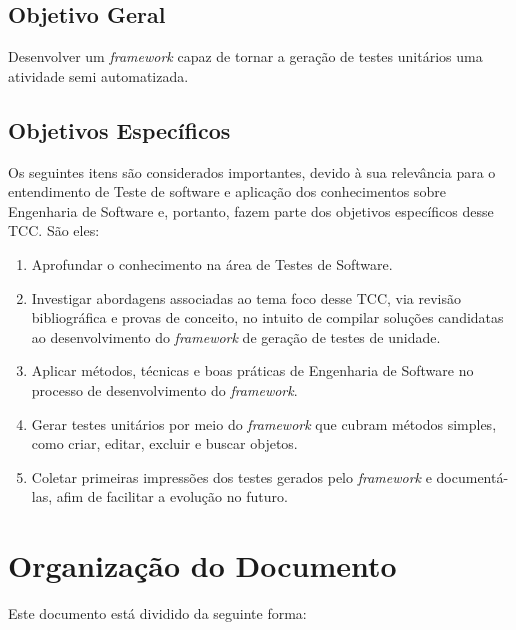     \subsection{Objetivo Geral}
    Desenvolver um \textit{framework} capaz de tornar a geração de testes unitários uma atividade semi automatizada.
    
    \subsection{Objetivos Específicos}
    Os seguintes itens são considerados importantes, devido à sua relevância para o entendimento de Teste de software e aplicação dos conhecimentos sobre Engenharia de Software e, portanto, fazem parte dos objetivos específicos desse TCC. São eles:

    \begin{enumerate}
      \item Aprofundar o conhecimento na área de Testes de Software.
      
      \item Investigar abordagens associadas ao tema foco desse TCC, via revisão bibliográfica e provas de conceito, no intuito de compilar soluções candidatas ao desenvolvimento do \textit{framework} de geração de testes de unidade.
      
      \item Aplicar métodos, técnicas e boas práticas de Engenharia de Software no processo de desenvolvimento do \textit{framework}.
      
      \item Gerar testes unitários por meio do \textit{framework} que cubram métodos simples, como criar, editar, excluir e buscar objetos.

      \item Coletar primeiras impressões dos testes gerados pelo \textit{framework} e documentá-las, afim de facilitar a evolução no futuro.

    \end{enumerate}
    
\section{Organização do Documento}
	Este documento está dividido da seguinte forma:
	
